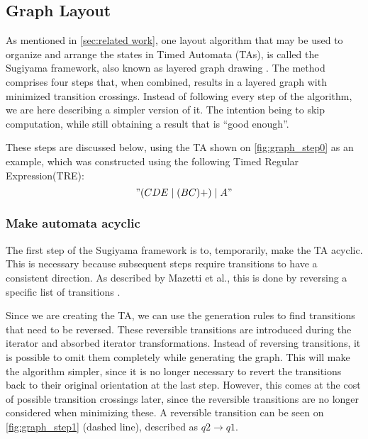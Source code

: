 \subsection{Graph Layout}\label{subsec:graphlayout}





As mentioned in \cref{sec:related work}, one layout algorithm that may be used to organize and arrange the states in Timed Automata (TAs), is called the Sugiyama framework, also known as layered graph drawing \cite{Sugiyama1981}. The method comprises four steps that, when combined, results in a layered graph with minimized transition crossings. Instead of following every step of the algorithm, we are here describing a simpler version of it. The intention being to skip computation, while still obtaining a result that is ``good enough''.

These steps are discussed below, using the TA shown on \cref{fig:graph_step0} as an example, which was constructed using the following Timed Regular Expression(TRE): $$"(CDE\mid(BC)+)\mid A"$$

\begin{center}
    
\end{center}

\subsubsection{Make automata acyclic}
The first step of the Sugiyama framework is to, temporarily, make the TA acyclic. This is necessary because subsequent steps require transitions to have a consistent direction. As described by Mazetti et al., this is done by reversing a specific list of transitions \cite{Mazetti2012}.

Since we are creating the TA, we can use the generation rules to find transitions that need to be reversed.
These reversible transitions are introduced during the iterator and absorbed iterator transformations.
Instead of reversing transitions, it is possible to omit them completely while generating the graph. This will make the algorithm simpler, since it is no longer necessary to revert the transitions back to their original orientation at the last step. However, this comes at the cost of possible transition crossings later, since the reversible transitions are no longer considered when minimizing these. A reversible transition can be seen on \cref{fig:graph_step1} (dashed line), described as $q2\rightarrow q1$.

